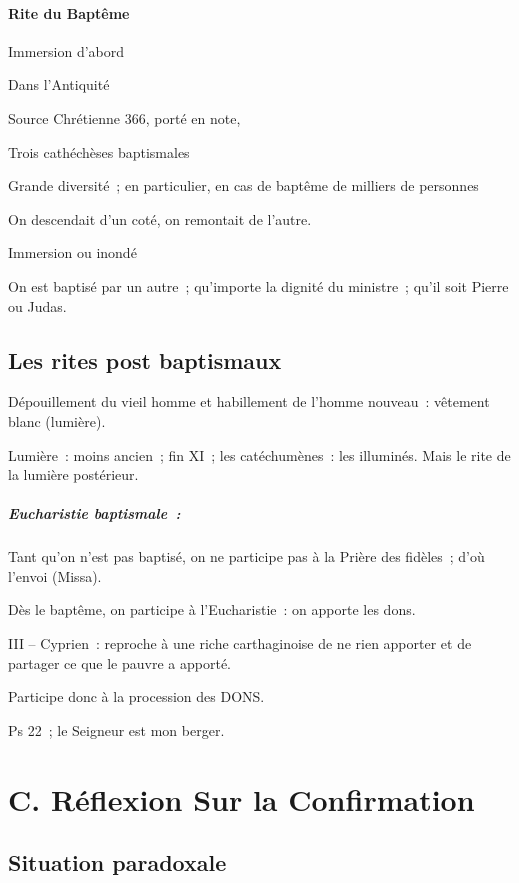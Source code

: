 \hypertarget{rite-du-baptuxeame}{%
\paragraph{Rite du Baptême}\label{rite-du-baptuxeame}}

Immersion d'abord

Dans l'Antiquité

Source Chrétienne 366, porté en note,

Trois cathéchèses baptismales

Grande diversité~; en particulier, en cas de baptême de milliers de
personnes

On descendait d'un coté, on remontait de l'autre.

Immersion ou inondé

On est baptisé par un autre~; qu'importe la dignité du ministre~; qu'il
soit Pierre ou Judas.

\hypertarget{les-rites-post-baptismaux}{%
\subsection{Les rites post baptismaux}\label{les-rites-post-baptismaux}}

Dépouillement du vieil homme et habillement de l'homme nouveau~:
vêtement blanc (lumière).

Lumière~: moins ancien~; fin XI~; les catéchumènes~: les illuminés. Mais
le rite de la lumière postérieur.

\hypertarget{eucharistie-baptismale}{%
\subparagraph{\texorpdfstring{Eucharistie baptismale~:
}{Eucharistie baptismale~: }}\label{eucharistie-baptismale}}

Tant qu'on n'est pas baptisé, on ne participe pas à la Prière des
fidèles~; d'où l'envoi (Missa).

Dès le baptême, on participe à l'Eucharistie~: on apporte les dons.

III -- Cyprien~: reproche à une riche carthaginoise de ne rien apporter
et de partager ce que le pauvre a apporté.

Participe donc à la procession des DONS.

Ps 22~; le Seigneur est mon berger.


\section{C. Réflexion Sur la Confirmation }

\hypertarget{situation-paradoxale}{%
\subsection{Situation paradoxale}\label{situation-paradoxale}}

